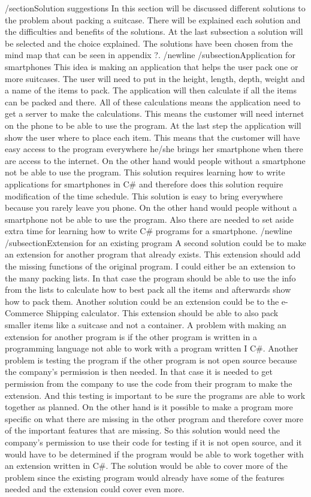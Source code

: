 /section{Solution suggestions}
In this section will be discussed different solutions to the problem about packing a suitcase. There will be explained each solution and the difficulties and benefits of the solutions. At the last subsection a solution will be selected and the choice explained. The solutions have been chosen from the mind map that can be seen in appendix ?.
/newline
/subsection{Application for smartphones}
This idea is making an application that helps the user pack one or more suitcases. The user will need to put in the height, length, depth, weight and a name of the items to pack. The application will then calculate if all the items can be packed and there. All of these calculations means the application need to get a server to make the calculations. This means the customer will need internet on the phone to be able to use the program. At the last step the application will show the user where to place each item. This means that the customer will have easy access to the program everywhere he/she brings her smartphone when there are access to the internet. On the other hand would people without a smartphone not be able to use the program. This solution requires learning how to write applications for smartphones in C# and therefore does this solution require modification of the time schedule. This solution is easy to bring everywhere because you rarely leave you phone. On the other hand would people without a smartphone not be able to use the program. Also there are needed to set aside extra time for learning how to write C# programs for a smartphone.
/newline
/subsection{Extension for an existing program}
A second solution could be to make an extension for another program that already exists. This extension should add the missing functions of the original program. I could either be an extension to the many packing lists. In that case the program should be able to use the info from the lists to calculate how to best pack all the items and afterwards show how to pack them. Another solution could be an extension could be to the e-Commerce Shipping calculator. This extension should be able to also pack smaller items like a suitcase and not a container. A problem with making an extension for another program is if the other program is written in a programming language not able to work with a program written I C#. Another problem is testing the program if the other program is not open source because the company’s permission is then needed. In that case it is needed to get permission from the company to use the code from their program to make the extension. And this testing is important to be sure the programs are able to work together as planned. On the other hand is it possible to make a program more specific on what there are missing in the other program and therefore cover more of the important features that are missing. So this solution would need the company’s permission to use their code for testing if it is not open source, and it would have to be determined if the program would be able to work together with an extension written in C#. The solution would be able to cover more of the problem since the existing program would already have some of the features needed and the extension could cover even more.
